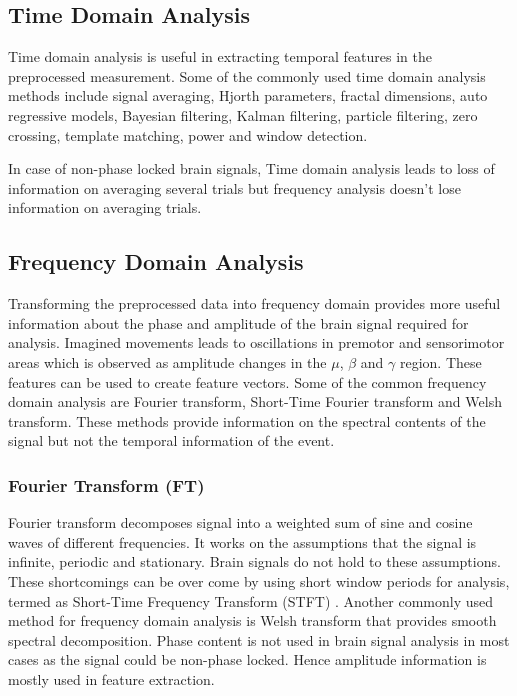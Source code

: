 \subsection{Time Domain Analysis}
Time domain analysis is useful in extracting temporal features in the preprocessed measurement. Some of the commonly used time domain analysis methods include signal averaging, Hjorth parameters, fractal dimensions, auto regressive models, Bayesian filtering, Kalman filtering, particle filtering, zero crossing, template matching, power and window detection.\par

In case of non-phase locked brain signals, Time domain analysis leads to loss of information on averaging several trials but frequency analysis doesn't lose information on averaging trials.

\subsection{Frequency Domain Analysis}
Transforming the preprocessed data into frequency domain provides more useful information about the phase and amplitude of the brain signal required for analysis. Imagined movements leads to oscillations in premotor and sensorimotor areas which is observed as amplitude changes in the $\mu$, $\beta$ and $\gamma$ region. These features can be used to create feature vectors. Some of the common frequency domain analysis are Fourier transform, Short-Time Fourier transform and Welsh transform. These methods provide information on the spectral contents of the signal but not the temporal information of the event. 

\subsubsection{Fourier Transform (FT)}
Fourier transform decomposes signal into a weighted sum of sine and cosine waves of different frequencies. It works on the assumptions that the signal is infinite, periodic and stationary. Brain signals do not hold to these assumptions. These shortcomings can be over come by using short window periods for analysis, termed as Short-Time Frequency Transform (STFT) . Another commonly used method for frequency domain analysis is Welsh transform that provides smooth spectral decomposition. Phase content is not used in brain signal analysis in most cases as the signal could be non-phase locked. Hence amplitude information is mostly used in feature extraction. 

